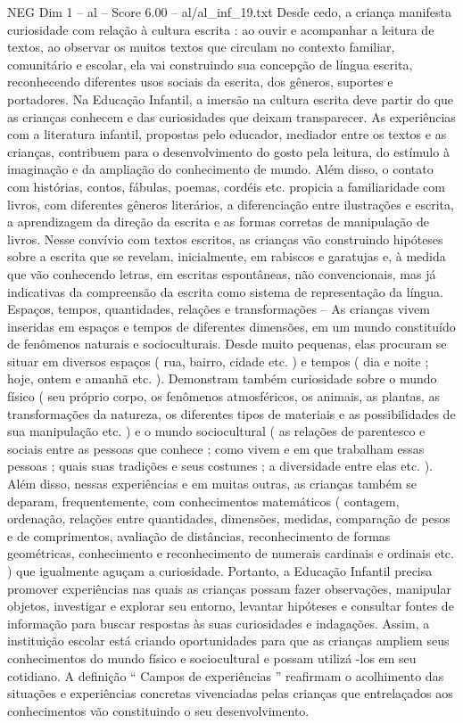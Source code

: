 \begin{textsample}{NEG Dim 1 – al – Score 6.00 – al/al\_inf\_19.txt}
Desde cedo, a criança manifesta curiosidade com relação à cultura escrita : ao ouvir e acompanhar a leitura de textos, ao observar os muitos textos que circulam no contexto familiar, comunitário e escolar, ela vai construindo sua concepção de língua escrita, reconhecendo diferentes usos sociais da escrita, dos gêneros, suportes e portadores.
Na Educação Infantil, a imersão na cultura escrita deve partir do que as crianças conhecem e das curiosidades que deixam transparecer.
As experiências com a literatura infantil, propostas pelo educador, mediador entre os textos e as crianças, contribuem para o desenvolvimento do gosto pela leitura, do estímulo à imaginação e da ampliação do conhecimento de mundo.
Além disso, o contato com histórias, contos, fábulas, poemas, cordéis etc. propicia a familiaridade com livros, com diferentes gêneros literários, a diferenciação entre ilustrações e escrita, a aprendizagem da direção da escrita e as formas corretas de manipulação de livros.
Nesse convívio com textos escritos, as crianças vão construindo hipóteses sobre a escrita que se revelam, inicialmente, em rabiscos e garatujas e, à medida que vão conhecendo letras, em escritas espontâneas, não convencionais, mas já indicativas da compreensão da escrita como sistema de representação da língua.
Espaços, tempos, quantidades, relações e transformações – As crianças vivem inseridas em espaços e tempos de diferentes dimensões, em um mundo constituído de fenômenos naturais e socioculturais.
Desde muito pequenas, elas procuram se situar em diversos espaços ( rua, bairro, cidade etc. ) e tempos ( dia e noite ; hoje, ontem e amanhã etc. ).
Demonstram também curiosidade sobre o mundo físico ( seu próprio corpo, os fenômenos atmosféricos, os animais, as plantas, as transformações da natureza, os diferentes tipos de materiais e as possibilidades de sua manipulação etc. ) e o mundo sociocultural ( as relações de parentesco e sociais entre as pessoas que conhece ; como vivem e em que trabalham essas pessoas ; quais suas tradições e seus costumes ; a diversidade entre elas etc. ).
Além disso, nessas experiências e em muitas outras, as crianças também se deparam, frequentemente, com conhecimentos matemáticos ( contagem, ordenação, relações entre quantidades, dimensões, medidas, comparação de pesos e de comprimentos, avaliação de distâncias, reconhecimento de formas geométricas, conhecimento e reconhecimento de numerais cardinais e ordinais etc. ) que igualmente aguçam a curiosidade.
Portanto, a Educação Infantil precisa promover experiências nas quais as crianças possam fazer observações, manipular objetos, investigar e explorar seu entorno, levantar hipóteses e consultar fontes de informação para buscar respostas às suas curiosidades e indagações.
Assim, a instituição escolar está criando oportunidades para que as crianças ampliem seus conhecimentos do mundo físico e sociocultural e possam utilizá -los em seu cotidiano.
A definição “ Campos de experiências ” reafirmam o acolhimento das situações e experiências concretas vivenciadas pelas crianças que entrelaçados aos conhecimentos vão constituindo o seu desenvolvimento.

\end{textsample}
